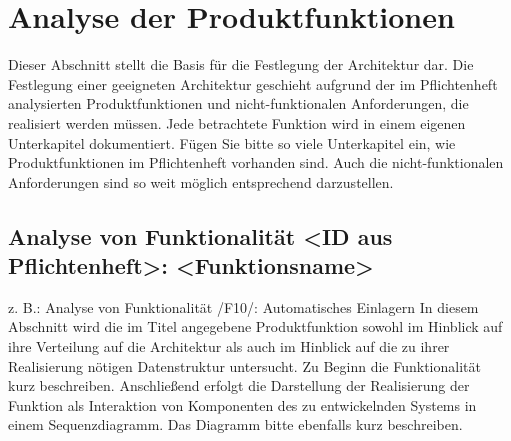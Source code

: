 \chapter{Analyse der Produktfunktionen}

Dieser Abschnitt stellt die Basis für die Festlegung der Architektur dar. Die
Festlegung einer geeigneten Architektur geschieht aufgrund der im Pflichtenheft
analysierten Produktfunktionen und nicht-funktionalen Anforderungen, die
realisiert werden müssen. Jede betrachtete Funktion wird in einem eigenen
Unterkapitel dokumentiert.  Fügen Sie bitte so viele Unterkapitel ein, wie
Produktfunktionen im Pflichtenheft vorhanden sind. Auch die nicht-funktionalen
Anforderungen sind so weit möglich entsprechend darzustellen.


\section{Analyse von Funktionalität <ID aus Pflichtenheft>: <Funktionsname>}
z. B.: Analyse von Funktionalität /F10/: Automatisches Einlagern
In diesem Abschnitt wird die im Titel angegebene Produktfunktion sowohl im
Hinblick auf ihre Verteilung auf die Architektur als auch im Hinblick auf die
zu ihrer Realisierung nötigen Datenstruktur untersucht.  Zu Beginn die
Funktionalität kurz beschreiben.  Anschließend erfolgt die Darstellung der
Realisierung der Funktion als Interaktion von Komponenten des zu entwickelnden
Systems in einem Sequenzdiagramm. Das Diagramm bitte ebenfalls kurz
beschreiben.

